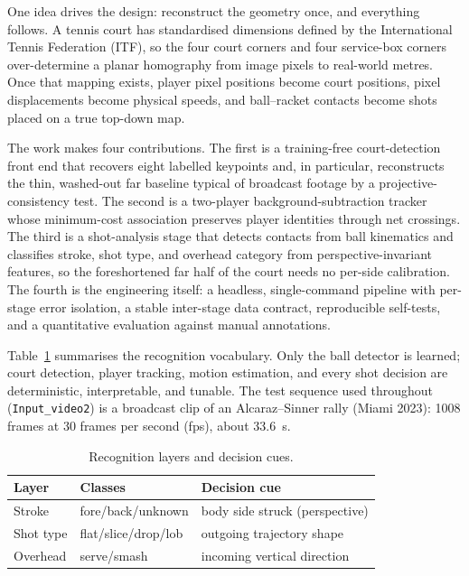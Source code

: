 \documentclass[11pt]{article}
\begin{document}
One idea drives the design: reconstruct the geometry once, and everything follows. A tennis court has standardised dimensions defined by the International Tennis Federation (ITF), so the four court corners and four service-box corners over-determine a planar homography from image pixels to real-world metres. Once that mapping exists, player pixel positions become court positions, pixel displacements become physical speeds, and ball--racket contacts become shots placed on a true top-down map.

The work makes four contributions. The first is a training-free court-detection front end that recovers eight labelled keypoints and, in particular, reconstructs the thin, washed-out far baseline typical of broadcast footage by a projective-consistency test. The second is a two-player background-subtraction tracker whose minimum-cost association preserves player identities through net crossings. The third is a shot-analysis stage that detects contacts from ball kinematics and classifies stroke, shot type, and overhead category from perspective-invariant features, so the foreshortened far half of the court needs no per-side calibration. The fourth is the engineering itself: a headless, single-command pipeline with per-stage error isolation, a stable inter-stage data contract, reproducible self-tests, and a quantitative evaluation against manual annotations.

Table~\ref{tab:vocab} summarises the recognition vocabulary. Only the ball detector is learned; court detection, player tracking, motion estimation, and every shot decision are deterministic, interpretable, and tunable. The test sequence used throughout (\texttt{Input\_video2}) is a broadcast clip of an Alcaraz--Sinner rally (Miami 2023): 1008 frames at 30 frames per second (fps), about 33.6~s.

\begin{table}[t]
\centering
\caption{Recognition layers and decision cues.}
\label{tab:vocab}
\small
\begin{tabular}{@{}lll@{}}
\toprule
Layer & Classes & Decision cue \\
\midrule
Stroke & fore/back/unknown & body side struck (perspective) \\
Shot type & flat/slice/drop/lob & outgoing trajectory shape \\
Overhead & serve/smash & incoming vertical direction \\
\bottomrule
\end{tabular}
\end{table}
\end{document}
